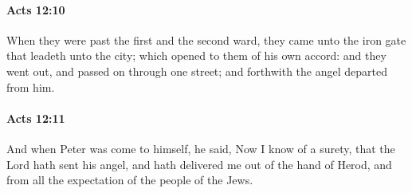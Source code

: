 		\paragraph{Acts 12:10} %
			\label{ACTS-12-10}

			When they were past the first and the second ward, they came unto the iron gate that leadeth unto the city; which opened to them of his own accord: and they went out, and passed on through one street; and forthwith the angel departed from him.

			\begin{framed}
			\scriptsize
				\begin{compactdesc}
					\item[SBLG] 
				\end{compactdesc}
			\end{framed}

		\paragraph{Acts 12:11} %
			\label{ACTS-12-11}

			And when Peter was come to himself, he said, Now I know of a surety, that the Lord hath sent his angel, and hath delivered me out of the hand of Herod, and from all the expectation of the people of the Jews.

